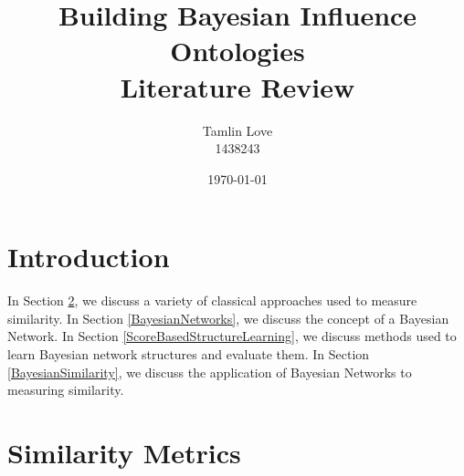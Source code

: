 \documentclass [11pt]{article}
\title{Building Bayesian Influence Ontologies\\Literature Review}
\author{Tamlin Love\\1438243}
\date{\today}
\begin{document}
\maketitle
\section{Introduction}
In Section \ref{SimilarityMetrics}, we discuss a variety of classical approaches used to measure similarity. In Section \ref{BayesianNetworks}, we discuss the concept of a Bayesian Network. In Section \ref{ScoreBasedStructureLearning}, we discuss methods used to learn Bayesian network structures and evaluate them. In Section \ref{BayesianSimilarity}, we discuss the application of Bayesian Networks to measuring similarity.
\section{Similarity Metrics}\label{SimilarityMetrics}
\end{document}
